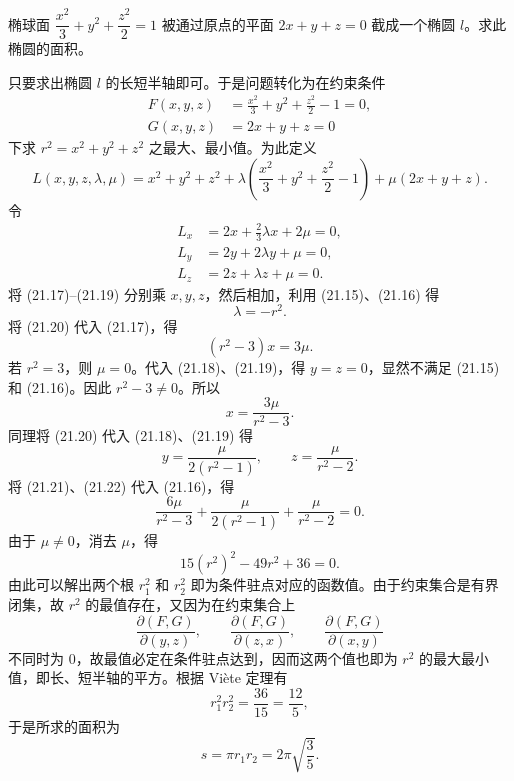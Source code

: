 \begin{xexample}[21.4.2]
椭球面 $\dfrac{x^2}{3}+y^2+\dfrac{z^2}{2}=1$ 被通过原点的平面 $2x+y+z=0$ 截成一个椭圆 $l$。求此椭圆的面积。
\end{xexample}
\begin{xsolution}
只要求出椭圆 $l$ 的长短半轴即可。于是问题转化为在约束条件
\begin{align}
  F(x,y,z)&=\frac{x^2}{3}+y^2+\frac{z^2}{2}-1=0, \tag{21.15}\label{eq:21.15}\\
  G(x,y,z)&=2x+y+z=0 \tag{21.16}\label{eq:21.16}
\end{align}
下求 $r^2=x^2+y^2+z^2$ 之最大、最小值。为此定义
\[
  L(x,y,z,\lambda,\mu)
  =x^2+y^2+z^2+\lambda\left(\frac{x^2}{3}+y^2+\frac{z^2}{2}-1\right)+\mu(2x+y+z).
\]
令
\begin{align}
  L_x&=2x+\frac23\lambda x+2\mu=0, \tag{21.17}\label{eq:21.17}\\
  L_y&=2y+2\lambda y+\mu=0, \tag{21.18}\label{eq:21.18}\\
  L_z&=2z+\lambda z+\mu=0. \tag{21.19}\label{eq:21.19}
\end{align}
将 (21.17)--(21.19) 分别乘 $x,y,z$，然后相加，利用 (21.15)、(21.16) 得
\begin{equation}
  \lambda=-r^2.
  \tag{21.20}
  \label{eq:21.20}
\end{equation}
将 (21.20) 代入 (21.17)，得
\[
  (r^2-3)x=3\mu.
\]
若 $r^2=3$，则 $\mu=0$。代入 (21.18)、(21.19)，得 $y=z=0$，显然不满足 (21.15) 和 (21.16)。因此 $r^2-3\ne0$。所以
\begin{equation}
  x=\frac{3\mu}{r^2-3}.
  \tag{21.21}
  \label{eq:21.21}
\end{equation}
同理将 (21.20) 代入 (21.18)、(21.19) 得
\begin{equation}
  y=\frac{\mu}{2(r^2-1)},\qquad z=\frac{\mu}{r^2-2}.
  \tag{21.22}
  \label{eq:21.22}
\end{equation}
将 (21.21)、(21.22) 代入 (21.16)，得
\begin{equation}
  \frac{6\mu}{r^2-3}+\frac{\mu}{2(r^2-1)}+\frac{\mu}{r^2-2}=0.
  \tag{21.23}
  \label{eq:21.23}
\end{equation}
由于 $\mu\ne0$，消去 $\mu$，得
\[
  15(r^2)^2-49r^2+36=0.
\]
由此可以解出两个根 $r_1^2$ 和 $r_2^2$ 即为条件驻点对应的函数值。由于约束集合是有界闭集，故 $r^2$ 的最值存在，又因为在约束集合上
\[
  \frac{\partial(F,G)}{\partial(y,z)},\qquad
  \frac{\partial(F,G)}{\partial(z,x)},\qquad
  \frac{\partial(F,G)}{\partial(x,y)}
\]
不同时为 $0$，故最值必定在条件驻点达到，因而这两个值也即为 $r^2$ 的最大最小值，即长、短半轴的平方。根据 Viète 定理有
\[
  r_1^2r_2^2=\frac{36}{15}=\frac{12}{5},
\]
于是所求的面积为
\[
  s=\pi r_1r_2=2\pi\sqrt{\frac35}.
\]
\end{xsolution}
